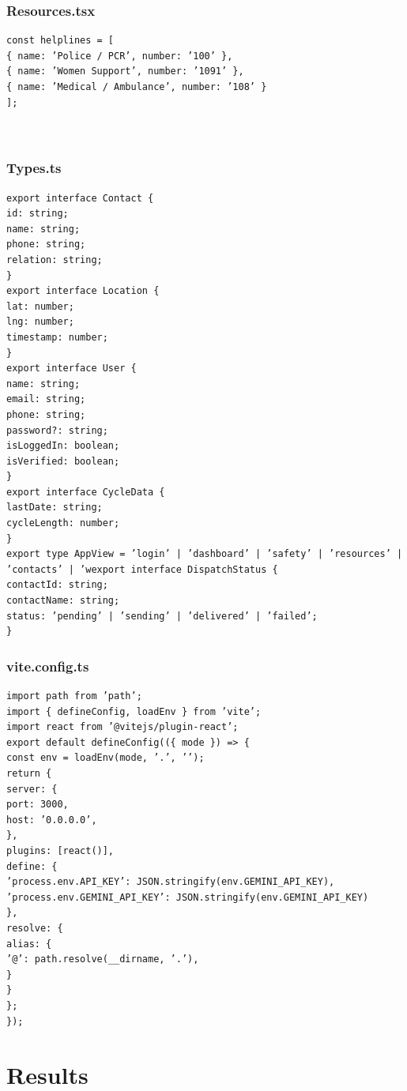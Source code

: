 \documentclass[a4paper,12pt]{report}
\begin{document}
\subsection{Resources.tsx}

\begin{lstlisting}
const helplines = [
{ name: ’Police / PCR’, number: ’100’ },
{ name: ’Women Support’, number: ’1091’ },
{ name: ’Medical / Ambulance’, number: ’108’ }
];



\end{lstlisting}

\subsection{Types.ts}

\begin{lstlisting}
export interface Contact {
id: string;
name: string;
phone: string;
relation: string;
}
export interface Location {
lat: number;
lng: number;
timestamp: number;
}
export interface User {
name: string;
email: string;
phone: string;
password?: string;
isLoggedIn: boolean;
isVerified: boolean;
}
export interface CycleData {
lastDate: string;
cycleLength: number;
}
export type AppView = ’login’ | ’dashboard’ | ’safety’ | ’resources’ | ’contacts’ | ’wexport interface DispatchStatus {
contactId: string;
contactName: string;
status: ’pending’ | ’sending’ | ’delivered’ | ’failed’;
}

\end{lstlisting}


\subsection{vite.config.ts}

\begin{lstlisting}
import path from ’path’;
import { defineConfig, loadEnv } from ’vite’;
import react from ’@vitejs/plugin-react’;
export default defineConfig(({ mode }) => {
const env = loadEnv(mode, ’.’, ’’);
return {
server: {
port: 3000,
host: ’0.0.0.0’,
},
plugins: [react()],
define: {
’process.env.API_KEY’: JSON.stringify(env.GEMINI_API_KEY),
’process.env.GEMINI_API_KEY’: JSON.stringify(env.GEMINI_API_KEY)
},
resolve: {
alias: {
’@’: path.resolve(__dirname, ’.’),
}
}
};
});

\end{lstlisting}


\chapter{Results}
\end{document}
